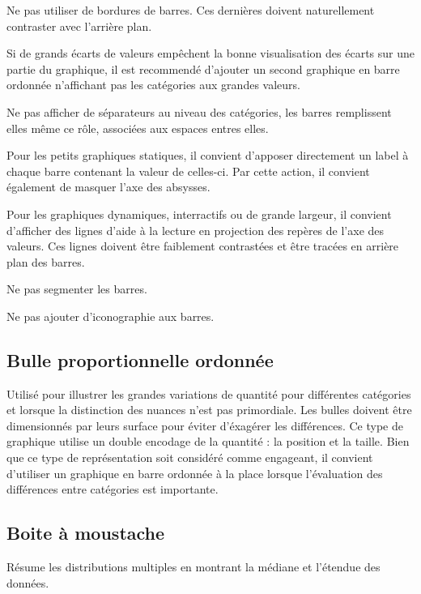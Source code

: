 \documentclass[a4paper,12pt]{article}
\begin{document}
\begin{multicols}{2}
Ne pas utiliser de bordures de barres. Ces dernières doivent naturellement contraster avec l'arrière plan.

Si de grands écarts de valeurs empêchent la bonne visualisation des écarts sur une partie du graphique, il est recommendé d'ajouter un second graphique en barre ordonnée n'affichant pas les catégories aux grandes valeurs. \autocite{jonathanschwabishComparingCategories2021}

Ne pas afficher de séparateurs au niveau des catégories, les barres remplissent elles même ce rôle, associées aux espaces entres elles. \autocite{jonathanschwabishComparingCategories2021}

Pour les petits graphiques statiques, il convient d'apposer directement un label à chaque barre contenant la valeur de celles-ci. Par cette action, il convient également de masquer l'axe des absysses. \autocite{jonathanschwabishComparingCategories2021}

Pour les graphiques dynamiques, interractifs ou de grande largeur, il convient d'afficher des lignes d'aide à la lecture en projection des repères de l'axe des valeurs. Ces lignes doivent être faiblement contrastées et être tracées en arrière plan des barres. \autocite{jonathanschwabishComparingCategories2021}

Ne pas segmenter les barres. \autocite{jonathanschwabishComparingCategories2021}

Ne pas ajouter d'iconographie aux barres. \autocite{tranDiscoveringAccessibleData2024}
\subsection*{Bulle proportionnelle ordonnée}
\label{sec:org30752c1}
Utilisé pour illustrer les grandes variations de quantité pour différentes catégories et lorsque la distinction des nuances n'est pas primordiale. Les bulles doivent être dimensionnés par leurs surface pour éviter d'éxagérer les différences. \autocite{jonathanschwabishComparingCategories2021} Ce type de graphique utilise un double encodage de la quantité : la position et la taille. \autocite{wilkeVisualizingAssociationsTwo2019} Bien que ce type de représentation soit considéré comme engageant, il convient d'utiliser un graphique en barre ordonnée à la place lorsque l'évaluation des différences entre catégories est importante. \autocite{jonathanschwabishComparingCategories2021}
\subsection*{Boite à moustache}
\label{sec:org936abb3}
Résume les distributions multiples en montrant la médiane et l'étendue des données. \autocite{alansmithLexiqueVisuel}


\end{multicols}
\end{document}
